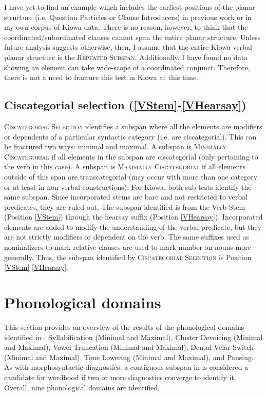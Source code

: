 \documentclass[output=paper]{langscibook}
\begin{document}
I have yet to find an example which includes the earliest positions of the planar structure (i.e. Question Particles or Clause Introducers) in previous work or in my own corpus of Kiowa data. There is no reason, however, to think that the coordinated/subordinated clauses cannot span the entire planar structure. Unless future analysis suggests otherwise, then, I assume that the entire Kiowa verbal planar structure is the {\textsc{Repeated Subspan}}. Additionally, I have found no data showing an element can take wide-scope of a coordinated conjunct. Therefore, there is not a need to fracture this test in Kiowa at this time. 

\subsection{Ciscategorial selection (\ref{VStem}-\ref{VHearsay})} \label{sec:ciscategorial}

{\textsc{Ciscategorial Selection}} identifies a subspan where all the elements are modifiers or dependents of a particular syntactic category (i.e. are ciscategorial). This can be fractured two ways: minimal and maximal. A subspan is {\textsc{Minimally Ciscategorial}} if all elements in the subspan are ciscategorial (only pertaining to the verb in this case). A subspan is {\textsc{Maximally Ciscategorial}} if all elements outside of this span are transcategorial (may occur with more than one category or at least in non-verbal constructions). For Kiowa, both sub-tests identify the same subspan. Since incorporated stems are bare and not restricted to verbal predicates, they are ruled out. The subspan identified is from the Verb Stem (Position \ref{VStem}) through the hearsay suffix (Position \ref{VHearsay}). Incorporated elements are added to modify the understanding of the verbal predicate, but they are not strictly modifiers or dependent on the verb. The same suffixes used as nominalizers to mark relative clauses are used to mark number on nouns more generally. Thus, the subspan identified by {\textsc{Ciscategorial Selection}} is Position \ref{VStem}-\ref{VHearsay}.

\section{Phonological domains} \label{sec:phonological}

This section provides an overview of the results of the phonological domains identified in : Syllabification (Minimal and Maximal), Cluster Devoicing (Minimal and Maximal), Vowel-Truncation (Minimal and Maximal), Dental-Velar Switch (Minimal and Maximal), Tone Lowering (Minimal and Maximal), and Pausing. As with morphosyntactic diagnostics, a contiguous subspan in  is considered a candidate for wordhood if two or more diagnostics converge to identify it. Overall, nine phonological domains are identified. %
\end{document}
